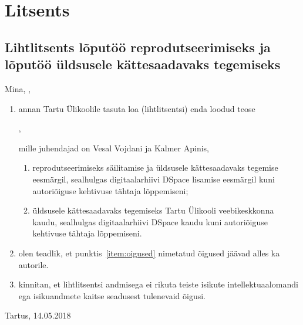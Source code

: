 \documentclass[../thesis.tex]{subfiles}
\begin{document}
\section{Litsents}

\subsection*{Lihtlitsents lõputöö reprodutseerimiseks ja lõputöö üldsusele kättesaadavaks tegemiseks}

Mina, \textbf{\myauthor},

\begin{enumerate}
	\item \label{item:oigused} annan Tartu Ülikoolile tasuta loa (lihtlitsentsi) enda loodud teose

	\textbf{\mytitle},

	mille juhendajad on Vesal Vojdani ja Kalmer Apinis,

	\begin{enumerate}[label*=\arabic*.] %
		\item reprodutseerimiseks säilitamise ja üldsusele kättesaadavaks tegemise eesmärgil, sealhulgas digitaalarhiivi DSpace lisamise eesmärgil kuni autoriõiguse kehtivuse tähtaja lõppemiseni;

		\item üldsusele kättesaadavaks tegemiseks Tartu Ülikooli veebikeskkonna kaudu, sealhulgas digitaalarhiivi DSpace kaudu kuni autoriõiguse kehtivuse tähtaja lõppemiseni.
	\end{enumerate}

	\item olen teadlik, et punktis~\ref{item:oigused} nimetatud õigused jäävad alles ka autorile.

	\item kinnitan, et lihtlitsentsi andmisega ei rikuta teiste isikute intellektuaalomandi ega isikuandmete kaitse seadusest tulenevaid õigusi. 
\end{enumerate}

\noindent
Tartus, 14.05.2018
\end{document}
